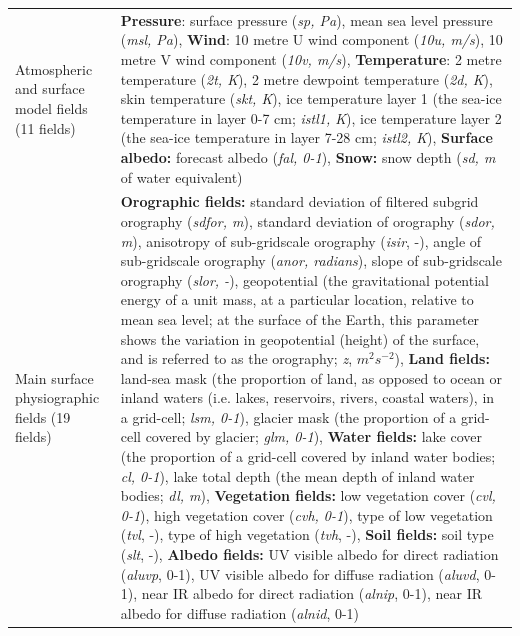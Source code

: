 \documentclass[hess, twostagejnl]{copernicus}
\begin{document}
\begin{table}
	\begin{tabularx}{\textwidth}{lX}
		\hline
		Atmospheric and surface model fields (11 fields)
		     & \textbf{Pressure}: surface pressure (\textit{sp, Pa}), mean sea level pressure (\textit{msl, Pa}), \newline 
		\textbf{Wind}: 10 metre U wind component (\textit{10u, m/s}), 10 metre V wind component (\textit{10v, m/s}), \newline 
		\textbf{Temperature}: 2 metre temperature (\textit{2t, K}), 2 metre dewpoint temperature (\textit{2d, K}), skin temperature (\textit{skt, K}), ice temperature layer 1 (the sea-ice temperature in layer 0-7 cm; \textit{istl1, K}), ice temperature layer 2 (the sea-ice temperature in layer 7-28 cm; \textit{istl2, K}), \newline 
		\textbf{Surface albedo:} forecast albedo (\textit{fal, 0-1}), \newline 
	\textbf{Snow:} snow depth (\textit{sd, m} of water equivalent)
		
		\\
		Main surface physiographic fields
		(19 fields)          & \textbf{Orographic fields:} standard deviation of filtered subgrid orography (\textit{sdfor, m}), standard deviation of orography (\textit{sdor, m}), anisotropy of sub-gridscale orography (\textit{isir}, -), angle of sub-gridscale orography (\textit{anor, radians}), slope of sub-gridscale orography (\textit{slor, -}), geopotential (the gravitational potential energy of a unit mass, at a particular location, relative to mean sea level; at the surface of the Earth, this parameter shows the variation in geopotential (height) of the surface, and is referred to as the orography; \textit{z}, $m^{2} s^{-2}$), \newline  
		\textbf{Land fields:} land-sea mask (the proportion of land, as opposed to ocean or inland waters (i.e. lakes, reservoirs, rivers, coastal waters), in a grid-cell; \textit{lsm, 0-1}), glacier mask (the proportion of a grid-cell covered by glacier; \textit{glm, 0-1}), \newline 
		\textbf{Water fields:} lake cover (the proportion of a grid-cell covered by inland water bodies; \textit{cl, 0-1}), lake total depth (the mean depth of inland water bodies; \textit{dl, m}), \newline 
		\textbf{Vegetation fields:} low vegetation cover (\textit{cvl, 0-1}), high vegetation cover (\textit{cvh, 0-1}), type of low vegetation (\textit{tvl}, -), type of high vegetation (\textit{tvh}, -), \newline 
		\textbf{Soil fields:} soil type (\textit{slt}, -), \newline 
		\textbf{Albedo fields:} UV visible albedo for direct radiation (\textit{aluvp}, 0-1), UV visible albedo for diffuse radiation (\textit{aluvd}, 0-1), near IR albedo for direct radiation (\textit{alnip}, 0-1), near IR albedo for diffuse radiation (\textit{alnid}, 0-1)
		

\end{tabularx}
\end{table}
\end{document}
